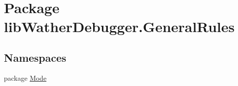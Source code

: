 \hypertarget{namespacelib_wather_debugger_1_1_general_rules}{\section{Package lib\+Wather\+Debugger.\+General\+Rules}
\label{namespacelib_wather_debugger_1_1_general_rules}
}
\subsection*{Namespaces}
\begin{DoxyCompactItemize}
\item 
package \hyperlink{namespacelib_wather_debugger_1_1_general_rules_1_1_mode}{Mode}
\end{DoxyCompactItemize}
